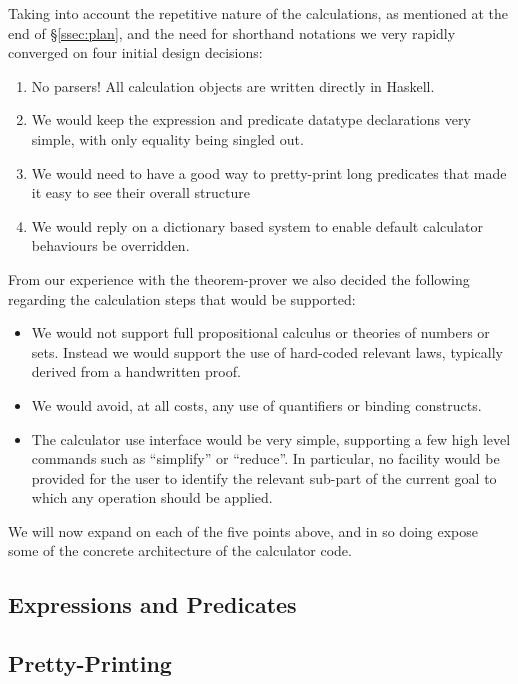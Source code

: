 Taking into account the repetitive nature of the calculations,
as mentioned at the end of \S\ref{ssec:plan},
and the need for shorthand notations we very rapidly converged
on four initial design decisions:
\begin{enumerate}
  \item No parsers! All calculation objects are written
  directly in Haskell.
  \item We would keep the expression and predicate datatype declarations
   very simple, with only equality being singled out.
  \item We would need to have a good way to pretty-print long predicates
    that made it easy to see their overall structure
  \item We would reply on a dictionary based system to enable default
    calculator behaviours be overridden.
\end{enumerate}
From our experience with the  theorem-prover we also decided
the following regarding the calculation steps that would be supported:
\begin{itemize}
  \item
    We would not support full  propositional calculus
    or theories of numbers or sets.
    Instead we would support the use of hard-coded relevant laws,
    typically derived from  a handwritten proof.
  \item
    We would avoid, at all costs,
    any use of quantifiers or binding constructs.
  \item
    The calculator use interface would be very simple,
    supporting a few high level commands such as ``simplify''
    or ``reduce''. In particular,
    no facility would be provided for the user to identify
    the relevant sub-part of the current goal to which any operation
    should be applied.
\end{itemize}


We will now expand on each of the five points above,
and in so doing expose some of the concrete architecture of the calculator code.

\subsection{Expressions and Predicates}\label{ssec:expr-pred}

\subsection{Pretty-Printing}\label{ssec:pp}

